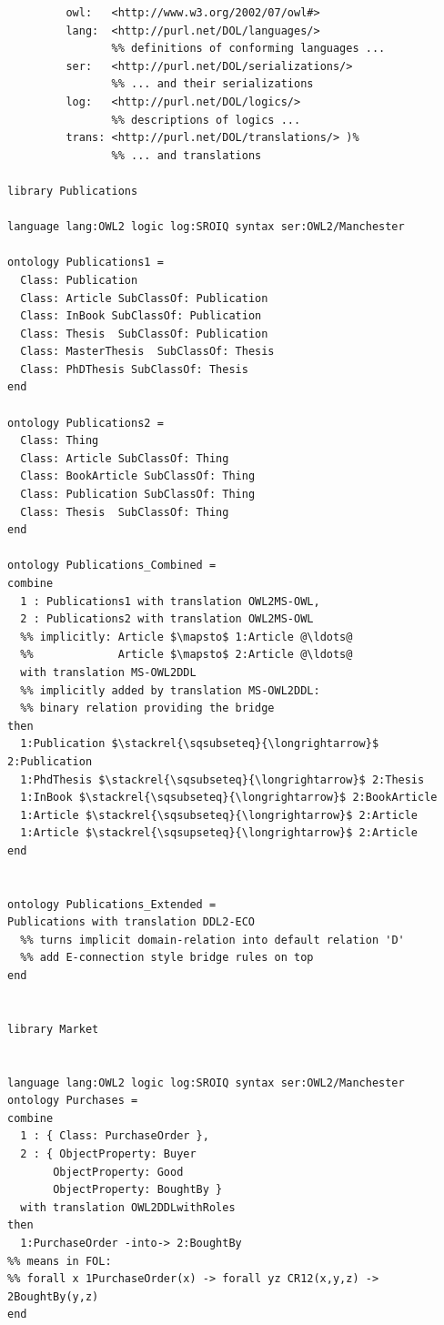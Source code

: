 \documentclass[10pt,fleqn,final]{scrreprt}
\begin{document}
\begin{lstlisting}[basicstyle=\ttfamily,language=dolText,alsolanguage=OWL2manchester,escapechar=@,mathescape]
%prefix( :      <http://www.example.org/mereology#>
         owl:   <http://www.w3.org/2002/07/owl#>
         lang:  <http://purl.net/DOL/languages/>
                %% definitions of conforming languages ...
         ser:   <http://purl.net/DOL/serializations/>
                %% ... and their serializations
         log:   <http://purl.net/DOL/logics/>
                %% descriptions of logics ...
         trans: <http://purl.net/DOL/translations/> )%
                %% ... and translations

library Publications

language lang:OWL2 logic log:SROIQ syntax ser:OWL2/Manchester

ontology Publications1 =
  Class: Publication
  Class: Article SubClassOf: Publication
  Class: InBook SubClassOf: Publication
  Class: Thesis  SubClassOf: Publication
  Class: MasterThesis  SubClassOf: Thesis
  Class: PhDThesis SubClassOf: Thesis
end

ontology Publications2 =
  Class: Thing
  Class: Article SubClassOf: Thing
  Class: BookArticle SubClassOf: Thing
  Class: Publication SubClassOf: Thing
  Class: Thesis  SubClassOf: Thing
end

ontology Publications_Combined =
combine
  1 : Publications1 with translation OWL2MS-OWL,
  2 : Publications2 with translation OWL2MS-OWL
  %% implicitly: Article $\mapsto$ 1:Article @\ldots@
  %%             Article $\mapsto$ 2:Article @\ldots@  
  with translation MS-OWL2DDL
  %% implicitly added by translation MS-OWL2DDL: 
  %% binary relation providing the bridge
then
  1:Publication $\stackrel{\sqsubseteq}{\longrightarrow}$ 2:Publication
  1:PhdThesis $\stackrel{\sqsubseteq}{\longrightarrow}$ 2:Thesis
  1:InBook $\stackrel{\sqsubseteq}{\longrightarrow}$ 2:BookArticle
  1:Article $\stackrel{\sqsubseteq}{\longrightarrow}$ 2:Article
  1:Article $\stackrel{\sqsupseteq}{\longrightarrow}$ 2:Article
end


ontology Publications_Extended =
Publications with translation DDL2-ECO
  %% turns implicit domain-relation into default relation 'D'
  %% add E-connection style bridge rules on top
end


library Market


language lang:OWL2 logic log:SROIQ syntax ser:OWL2/Manchester
ontology Purchases =
combine
  1 : { Class: PurchaseOrder },
  2 : { ObjectProperty: Buyer
       ObjectProperty: Good
       ObjectProperty: BoughtBy }
  with translation OWL2DDLwithRoles
then
  1:PurchaseOrder -into-> 2:BoughtBy
%% means in FOL: 
%% forall x 1PurchaseOrder(x) -> forall yz CR12(x,y,z) -> 2BoughtBy(y,z)
end


\end{lstlisting}
\end{document}
